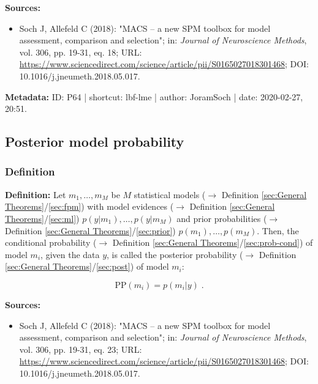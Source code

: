 \documentclass[a4paper,12pt,twoside]{book}
\begin{document}
\vspace{1em}
\textbf{Sources:}
\begin{itemize}
\item Soch J, Allefeld C (2018): "MACS – a new SPM toolbox for model assessment, comparison and selection"; in: \textit{Journal of Neuroscience Methods}, vol. 306, pp. 19-31, eq. 18; URL: \url{https://www.sciencedirect.com/science/article/pii/S0165027018301468}; DOI: 10.1016/j.jneumeth.2018.05.017.
\end{itemize}


\vspace{1em}
\textbf{Metadata:} ID: P64 | shortcut: lbf-lme | author: JoramSoch | date: 2020-02-27, 20:51.
\vspace{1em}



\subsection{Posterior model probability}

\subsubsection[\textit{Definition}]{Definition} \label{sec:pmp}
\setcounter{equation}{0}

\textbf{Definition:} Let $m_1, \ldots, m_M$ be $M$ statistical models ($\rightarrow$ Definition \ref{sec:General Theorems}/\ref{sec:fpm}) with model evidences ($\rightarrow$ Definition \ref{sec:General Theorems}/\ref{sec:ml}) $p(y \vert m_1), \ldots, p(y \vert m_M)$ and prior probabilities ($\rightarrow$ Definition \ref{sec:General Theorems}/\ref{sec:prior})  $p(m_1), \ldots, p(m_M)$. Then, the conditional probability ($\rightarrow$ Definition \ref{sec:General Theorems}/\ref{sec:prob-cond}) of model $m_i$, given the data $y$, is called the posterior probability ($\rightarrow$ Definition \ref{sec:General Theorems}/\ref{sec:post}) of model $m_i$:

\begin{equation} \label{eq:pmp-PMP}
\mathrm{PP}(m_i) = p(m_i|y) \; .
\end{equation}


\vspace{1em}
\textbf{Sources:}
\begin{itemize}
\item Soch J, Allefeld C (2018): "MACS – a new SPM toolbox for model assessment, comparison and selection"; in: \textit{Journal of Neuroscience Methods}, vol. 306, pp. 19-31, eq. 23; URL: \url{https://www.sciencedirect.com/science/article/pii/S0165027018301468}; DOI: 10.1016/j.jneumeth.2018.05.017.
\end{itemize}
\end{document}
